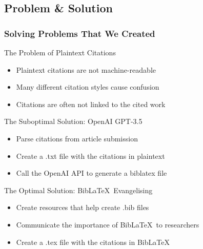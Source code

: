 \documentclass[aspectratio=169,9pt,xcolor=dvipsnames]{beamer}
\begin{document}
\subsection{Problem \& Solution}
\begin{frame}[t]
    \frametitle{Solving Problems That We Created}
    \begin{block}{The Problem of Plaintext Citations}
        \begin{itemize}
            \item Plaintext citations are not machine-readable
            \item Many different citation styles cause confusion
            \item Citations are often not linked to the cited work
        \end{itemize}
    \end{block}
    \begin{block}{The Suboptimal Solution: OpenAI GPT-3.5}
        \begin{itemize}
            \item Parse citations from article submission
            \item Create a .txt file with the citations in plaintext
            \item Call the OpenAI API to generate a biblatex file
        \end{itemize}
    \end{block}
\begin{block}{The Optimal Solution: Bib\LaTeX\ Evangelising}
    \begin{itemize}
        \item Create resources that help create .bib files
        \item Communicate the importance of Bib\LaTeX\ to researchers
        \item Create a .tex file with the citations in Bib\LaTeX
    \end{itemize}
\end{block}
\centering
\end{frame}

\end{document}
